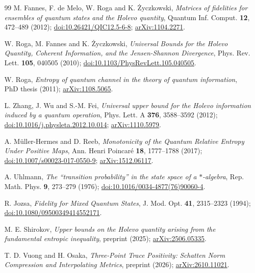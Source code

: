 \documentclass[11pt,a4paper]{article}
\theoremstyle{definition}
\theoremstyle{plain}
\begin{document}
\clearpage
\begingroup\small
\begin{thebibliography}{99}
\setlength{\itemsep}{2pt}
M. Fannes, F. de Melo, W. Roga and K. \.Zyczkowski,
\emph{Matrices of fidelities for ensembles of quantum states and the Holevo
quantity},
Quantum Inf. Comput. \textbf{12}, 472--489 (2012);
\href{https://doi.org/10.26421/QIC12.5-6-8}{doi:10.26421/QIC12.5-6-8};
\href{https://arxiv.org/abs/1104.2271}{arXiv:1104.2271}.

W. Roga, M. Fannes and K. \.Zyczkowski,
\emph{Universal Bounds for the Holevo Quantity, Coherent Information, and the
Jensen-Shannon Divergence},
Phys. Rev. Lett. \textbf{105}, 040505 (2010);
\href{https://doi.org/10.1103/PhysRevLett.105.040505}{doi:10.1103/PhysRevLett.105.040505}.

W. Roga,
\emph{Entropy of quantum channel in the theory of quantum information},
PhD thesis (2011);
\href{https://arxiv.org/abs/1108.5065}{arXiv:1108.5065}.

L. Zhang, J. Wu and S.-M. Fei,
\emph{Universal upper bound for the Holevo information induced by a quantum
operation},
Phys. Lett. A \textbf{376}, 3588--3592 (2012);
\href{https://doi.org/10.1016/j.physleta.2012.10.014}{doi:10.1016/j.physleta.2012.10.014};
\href{https://arxiv.org/abs/1110.5979}{arXiv:1110.5979}.

A. M\"uller-Hermes and D. Reeb,
\emph{Monotonicity of the Quantum Relative Entropy Under Positive Maps},
Ann. Henri Poincar\'e \textbf{18}, 1777--1788 (2017);
\href{https://doi.org/10.1007/s00023-017-0550-9}{doi:10.1007/s00023-017-0550-9};
\href{https://arxiv.org/abs/1512.06117}{arXiv:1512.06117}.

A. Uhlmann,
\emph{The ``transition probability'' in the state space of a $*$-algebra},
Rep. Math. Phys. \textbf{9}, 273--279 (1976);
\href{https://doi.org/10.1016/0034-4877(76)90060-4}{doi:10.1016/0034-4877(76)90060-4}.

R. Jozsa,
\emph{Fidelity for Mixed Quantum States},
J. Mod. Opt. \textbf{41}, 2315--2323 (1994);
\href{https://doi.org/10.1080/09500349414552171}{doi:10.1080/09500349414552171}.

M. E. Shirokov,
\emph{Upper bounds on the Holevo quantity arising from the fundamental entropic
inequality}, preprint (2025);
\href{https://arxiv.org/abs/2506.05335}{arXiv:2506.05335}.

T. D. Vuong and H. Osaka,
\emph{Three-Point Trace Positivity: Schatten Norm Compression and Interpolating
Metrics}, preprint (2026);
\href{https://arxiv.org/abs/2610.11021}{arXiv:2610.11021}.
\end{thebibliography}
\endgroup
\end{document}
